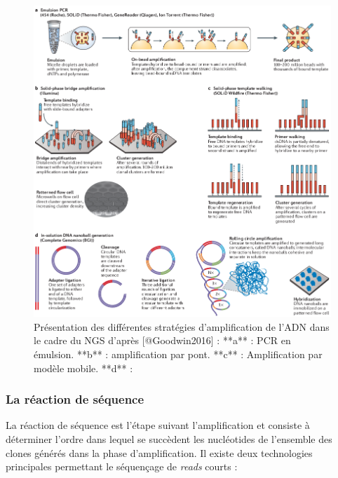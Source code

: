 \documentclass[12pt,twoside]{reedthesis}
\theoremstyle{definition}
\theoremstyle{definition}
\theoremstyle{remark}
\begin{document}
  \begin{figure}
  
  {\centering \includegraphics[scale=.455]{figure/ngs_amplification} 
  
  }
  
  \caption[Présentation des différentes stratégies d'amplification de l'ADN dans le cadre du NGS]{Présentation des différentes stratégies d'amplification de l'ADN dans le cadre du NGS d'après [@Goodwin2016] : **a** : PCR en émulsion. **b** : amplification par pont. **c** : Amplification par modèle mobile. **d** : }\label{fig:ngsampli}
  \end{figure}
  
  \subsubsection{La réaction de séquence}\label{la-reaction-de-sequence}
  
  La réaction de séquence est l'étape suivant l'amplification et consiste
  à déterminer l'ordre dans lequel se succèdent les nucléotides de
  l'ensemble des clones générés dans la phase d'amplification. Il existe
  deux technologies principales permettant le séquençage de \emph{reads}
  courts :\\
  
\end{document}

